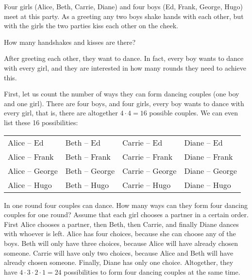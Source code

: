 Four girls (Alice, Beth, Carrie, Diane) 
and four boys (Ed, Frank, George, Hugo) meet at this party. 
As a greeting any two boys shake hands with each other, 
but with the girls the two parties kiss each other on the cheek. 
\begin{exercise}\label{ex:kisses}
How many handshakes and kisses are there? 
\end{exercise}
After greeting each other, 
they want to dance. 
In fact, every boy wants to dance with every girl, 
and they are interested in how many rounds they need to achieve this. 

First, 
let us count the number of ways they can form dancing couples (one boy and one girl). 
There are four boys, and four girls, every boy wants to dance with every girl, 
that is, there are altogether $4 \cdot 4 = 16$ possible couples. 
We can even list these 16 possibilities: 

\vskip 12pt
\begin{tabular}{llll}
Alice -- Ed & Beth -- Ed & Carrie -- Ed & Diane -- Ed \\
Alice -- Frank & Beth -- Frank & Carrie -- Frank & Diane -- Frank \\
Alice -- George & Beth -- George & Carrie -- George & Diane -- George \\
Alice -- Hugo & Beth -- Hugo & Carrie -- Hugo & Diane -- Hugo 
\end{tabular}
\vskip 12pt

In one round four couples can dance. 
How many ways can they form four dancing couples for one round? 
Assume that each girl chooses a partner in a certain order. 
First Alice chooses a partner, then Beth, then Carrie, and finally Diane dances with whoever is left. 
Alice has four choices, because she can choose any of the boys. 
Beth will only have three choices, because Alice will have already chosen someone. 
Carrie will have only two choices, because Alice and Beth will have already chosen someone. 
Finally, Diane has only one choice. 
Altogether, they have $4 \cdot 3 \cdot 2 \cdot 1 = 24$ possibilities to form four dancing couples at the same time. 

%

